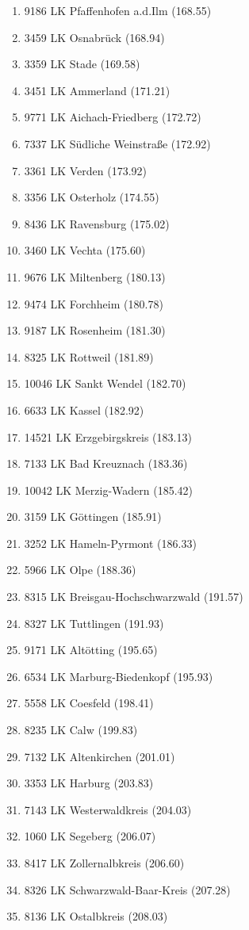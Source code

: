 \begin{enumerate}[itemsep=-6mm]
\item 9186 LK Pfaffenhofen a.d.Ilm (168.55)
\item 3459 LK Osnabrück (168.94)
\item 3359 LK Stade (169.58)
\item 3451 LK Ammerland (171.21)
\item 9771 LK Aichach-Friedberg (172.72)
\item 7337 LK Südliche Weinstraße (172.92)
\item 3361 LK Verden (173.92)
\item 3356 LK Osterholz (174.55)
\item 8436 LK Ravensburg (175.02)
\item 3460 LK Vechta (175.60)
\item 9676 LK Miltenberg (180.13)
\item 9474 LK Forchheim (180.78)
\item 9187 LK Rosenheim (181.30)
\item 8325 LK Rottweil (181.89)
\item 10046 LK Sankt Wendel (182.70)
\item 6633 LK Kassel (182.92)
\item 14521 LK Erzgebirgskreis (183.13)
\item 7133 LK Bad Kreuznach (183.36)
\item 10042 LK Merzig-Wadern (185.42)
\item 3159 LK Göttingen (185.91)
\item 3252 LK Hameln-Pyrmont (186.33)
\item 5966 LK Olpe (188.36)
\item 8315 LK Breisgau-Hochschwarzwald (191.57)
\item 8327 LK Tuttlingen (191.93)
\item 9171 LK Altötting (195.65)
\item 6534 LK Marburg-Biedenkopf (195.93)
\item 5558 LK Coesfeld (198.41)
\item 8235 LK Calw (199.83)
\item 7132 LK Altenkirchen (201.01)
\item 3353 LK Harburg (203.83)
\item 7143 LK Westerwaldkreis (204.03)
\item 1060 LK Segeberg (206.07)
\item 8417 LK Zollernalbkreis (206.60)
\item 8326 LK Schwarzwald-Baar-Kreis (207.28)
\item 8136 LK Ostalbkreis (208.03)

\end{enumerate}

